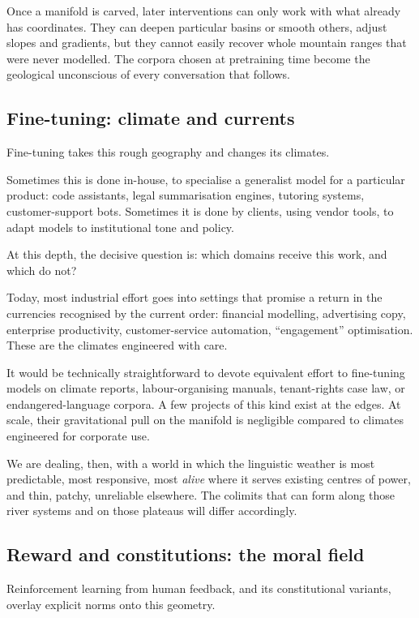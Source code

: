 \documentclass[12pt,a4paper]{article}
\begin{document}
Once a manifold is carved, later interventions can only work with what already has coordinates. They can deepen particular basins or smooth others, adjust slopes and gradients, but they cannot easily recover whole mountain ranges that were never modelled. The corpora chosen at pretraining time become the geological unconscious of every conversation that follows.

\subsection{Fine-tuning: climate and currents}

Fine-tuning takes this rough geography and changes its climates.

Sometimes this is done in-house, to specialise a generalist model for a particular product: code assistants, legal summarisation engines, tutoring systems, customer-support bots. Sometimes it is done by clients, using vendor tools, to adapt models to institutional tone and policy.

At this depth, the decisive question is: which domains receive this work, and which do not?

Today, most industrial effort goes into settings that promise a return in the currencies recognised by the current order: financial modelling, advertising copy, enterprise productivity, customer-service automation, ``engagement'' optimisation. These are the climates engineered with care.

It would be technically straightforward to devote equivalent effort to fine-tuning models on climate reports, labour-organising manuals, tenant-rights case law, or endangered-language corpora. A few projects of this kind exist at the edges. At scale, their gravitational pull on the manifold is negligible compared to climates engineered for corporate use.

We are dealing, then, with a world in which the linguistic weather is most predictable, most responsive, most \emph{alive} where it serves existing centres of power, and thin, patchy, unreliable elsewhere. The colimits that can form along those river systems and on those plateaus will differ accordingly.

\subsection{Reward and constitutions: the moral field}

Reinforcement learning from human feedback, and its constitutional variants, overlay explicit norms onto this geometry.
\end{document}
